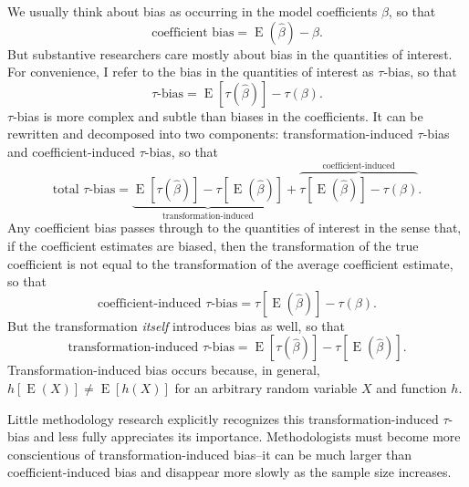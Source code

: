 \documentclass[12pt]{article}
\DeclareMathOperator*{\E}{\text{E}}
\begin{document}
We usually think about bias as occurring in the model coefficients $\beta$, so that 
\begin{equation}
\text{coefficient bias} = \E(\hat{\beta}) - \beta \text{.}  \nonumber
\end{equation}
But substantive researchers care mostly about bias in the quantities of interest. For convenience, I refer to the bias in the quantities of interest as $\tau$-bias, so that
\begin{equation}
\tau\text{-bias} = \E[\tau(\hat{\beta})] - \tau(\beta)\text{.} \nonumber
\end{equation}
$\tau$-bias is more complex and subtle than biases in the coefficients. 
It can be rewritten and decomposed into two components: transformation-induced $\tau$-bias and coefficient-induced $\tau$-bias, so that
\begin{equation}
\text{total } \tau\text{-bias}= \underbrace{ \E[\tau(\hat{\beta})]-  \tau[\E(\hat{\beta})]  }_{\text{transformation-induced}} + \overbrace{  \tau[\E(\hat{\beta})] - \tau(\beta)  }^{\text{coefficient-induced}}\text{.} \nonumber
\end{equation}
Any coefficient bias passes through to the quantities of interest in the sense that, if the coefficient estimates are biased, then the transformation of the true coefficient is not equal to the transformation of the average coefficient estimate, so that
\begin{equation}
\text{coefficient-induced } \tau\text{-bias} = \tau[\E(\hat{\beta})] - \tau(\beta) \text{.}\nonumber
\end{equation}
But the transformation \textit{itself} introduces bias as well, so that
\begin{equation}
\text{transformation-induced } \tau\text{-bias} = \E[\tau(\hat{\beta})]-  \tau[\E(\hat{\beta})] \text{.}\nonumber
\end{equation}
Transformation-induced bias occurs because, in general, $h[\E(X)] \neq \E[h(X)]$ for an arbitrary random variable $X$ and function $h$.

Little methodology research explicitly recognizes this transformation-induced $\tau$-bias and less fully appreciates its importance. 
Methodologists must become more conscientious of transformation-induced bias--it can be much larger than coefficient-induced bias and disappear more slowly as the sample size increases.

\end{document}
